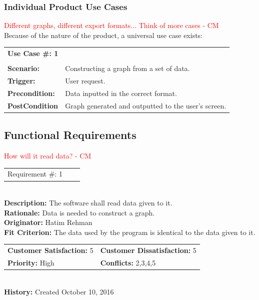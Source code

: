 \documentclass[12pt, titlepage]{article}
\begin{document}
\subsubsection{Individual Product Use Cases}
\textcolor{red}{Different graphs, different export formats... Think of more cases - CM} \\
Because of the nature of the product, a universal use case exists: 

\begin{reqbox}
    \begin{tabular}{l p{10cm}}

	\bf{Use Case \#: 1} & \\
	 & \\
	{\bfseries Scenario: } 	& 	Constructing a graph from a set of data.	\\
	{\bfseries Trigger: }   		& 	User request. 					\\
	{\bfseries Precondition: } 	&	Data inputted in the correct format.		\\
	{\bfseries PostCondition } 	& 	Graph generated and outputted to the user's screen.				\\

    \end{tabular}
\end{reqbox}


\subsection{Functional Requirements}
\textcolor{red}{How will it read data? - CM} \\
\begin{reqbox}
\begin{tabular}{ccc}Requirement \#: 1
\end{tabular} \\
\textbf{Description:} The software shall read data given to it.\\
\textbf{Rationale:} Data is needed to construct a graph. \\
\textbf{Originator:} Hatim Rehman \\
\textbf{Fit Criterion:} The data used by the program is identical to the data given to it.\\
\begin{tabular}{ll}
\textbf{Customer Satisfaction:} 5 & \textbf{Customer Dissatisfaction:} 5 \\
\textbf{Priority:} High & \textbf{Conflicts:} 2,3,4,5\\
\end{tabular} \\
\textbf{History:} Created October 10, 2016
\end{reqbox}
\end{document}
